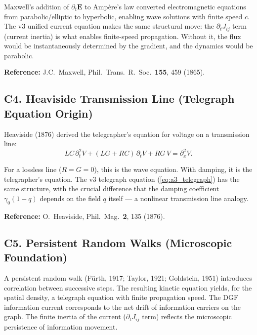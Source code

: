 \documentclass[reprint]{revtex4-2}
\begin{document}
Maxwell's addition of $\partial_t\mathbf{E}$ to Amp\`ere's law converted electromagnetic equations from parabolic/elliptic to hyperbolic, enabling wave solutions with finite speed $c$. The v3 unified current equation makes the same structural move: the $\partial_t J_{ij}$ term (current inertia) is what enables finite-speed propagation. Without it, the flux would be instantaneously determined by the gradient, and the dynamics would be parabolic.

\textbf{Reference:} J.C.\ Maxwell, Phil.\ Trans.\ R.\ Soc.\ \textbf{155}, 459 (1865).

\subsection{C4. Heaviside Transmission Line (Telegraph Equation Origin)}

Heaviside (1876) derived the telegrapher's equation for voltage on a transmission line:
\begin{equation}
LC\,\partial_t^2 V + (LG+RC)\,\partial_t V + RG\,V = \partial_x^2 V.
\end{equation}

For a lossless line ($R=G=0$), this is the wave equation. With damping, it is the telegrapher's equation. The v3 telegraph equation (\ref{eq:a3_telegraph}) has the same structure, with the crucial difference that the damping coefficient $\gamma_0(1-q)$ depends on the field $q$ itself --- a nonlinear transmission line analogy.

\textbf{Reference:} O.\ Heaviside, Phil.\ Mag.\ \textbf{2}, 135 (1876).

\subsection{C5. Persistent Random Walks (Microscopic Foundation)}

A persistent random walk (F\"urth, 1917; Taylor, 1921; Goldstein, 1951) introduces correlation between successive steps. The resulting kinetic equation yields, for the spatial density, a telegraph equation with finite propagation speed. The DGF information current corresponds to the net drift of information carriers on the graph. The finite inertia of the current ($\partial_t J_{ij}$ term) reflects the microscopic persistence of information movement.
\end{document}
